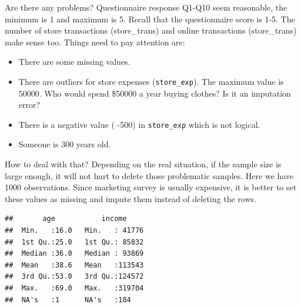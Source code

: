 \documentclass[12pt,]{krantz}
\newenvironment{Shaded}{\begin{snugshade}}{\end{snugshade}}
\newcommand{\KeywordTok}[1]{\textcolor[rgb]{0.13,0.29,0.53}{\textbf{#1}}}
\newcommand{\DataTypeTok}[1]{\textcolor[rgb]{0.13,0.29,0.53}{#1}}
\newcommand{\DecValTok}[1]{\textcolor[rgb]{0.00,0.00,0.81}{#1}}
\newcommand{\StringTok}[1]{\textcolor[rgb]{0.31,0.60,0.02}{#1}}
\newcommand{\CommentTok}[1]{\textcolor[rgb]{0.56,0.35,0.01}{\textit{#1}}}
\newcommand{\OtherTok}[1]{\textcolor[rgb]{0.56,0.35,0.01}{#1}}
\newcommand{\OperatorTok}[1]{\textcolor[rgb]{0.81,0.36,0.00}{\textbf{#1}}}
\newcommand{\NormalTok}[1]{#1}
\providecommand{\tightlist}{%
  \setlength{\itemsep}{0pt}\setlength{\parskip}{0pt}}
\theoremstyle{definition}
\theoremstyle{definition}
\theoremstyle{definition}
\theoremstyle{remark}
\begin{document}
Are there any problems? Questionnaire response Q1-Q10 seem reasonable,
the minimum is 1 and maximum is 5. Recall that the questionnaire score
is 1-5. The number of store transactions (store\_trans) and online
transactions (store\_trans) make sense too. Things need to pay attention
are:

\begin{itemize}
\tightlist
\item
  There are some missing values.
\item
  There are outliers for store expenses (\texttt{store\_exp}). The
  maximum value is 50000. Who would spend \$50000 a year buying clothes?
  Is it an imputation error?
\item
  There is a negative value ( -500) in \texttt{store\_exp} which is not
  logical.
\item
  Someone is 300 years old.
\end{itemize}

How to deal with that? Depending on the real situation, if the sample
size is large enough, it will not hurt to delete those problematic
samples. Here we have 1000 observations. Since marketing survey is
usually expensive, it is better to set these values as missing and
impute them instead of deleting the rows.

\begin{Shaded}
\end{Shaded}

\begin{verbatim}
##       age           income      
##  Min.   :16.0   Min.   : 41776  
##  1st Qu.:25.0   1st Qu.: 85832  
##  Median :36.0   Median : 93869  
##  Mean   :38.6   Mean   :113543  
##  3rd Qu.:53.0   3rd Qu.:124572  
##  Max.   :69.0   Max.   :319704  
##  NA's   :1      NA's   :184
\end{verbatim}
\end{document}

